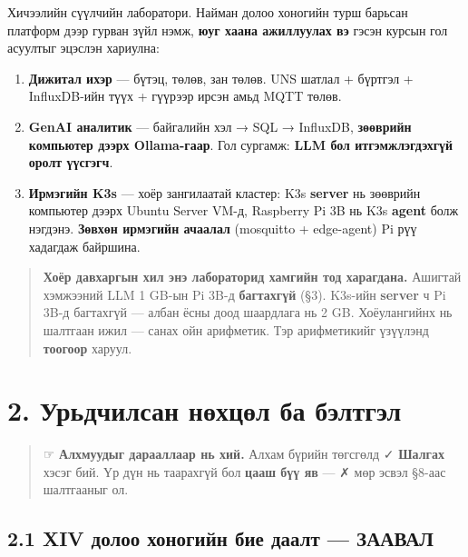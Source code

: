 Хичээлийн сүүлчийн лаборатори. Найман долоо хоногийн турш барьсан платформ дээр гурван зүйл нэмж, \textbf{юуг хаана ажиллуулах вэ} гэсэн курсын гол асуултыг эцэслэн хариулна:

\begin{enumerate}
\def\labelenumi{\arabic{enumi}.}
\tightlist
\item
  \textbf{Дижитал ихэр} --- бүтэц, төлөв, зан төлөв. UNS шатлал + бүртгэл + InfluxDB-ийн түүх + гүүрээр ирсэн амьд MQTT төлөв.
\item
  \textbf{GenAI аналитик} --- байгалийн хэл → SQL → InfluxDB, \textbf{зөөврийн компьютер дээрх Ollama-гаар}. Гол сургамж: \textbf{LLM бол итгэмжлэгдэхгүй оролт үүсгэгч}.
\item
  \textbf{Ирмэгийн K3s} --- хоёр зангилаатай кластер: K3s \textbf{server} нь зөөврийн компьютер дээрх Ubuntu Server VM-д, Raspberry Pi 3B нь K3s \textbf{agent} болж нэгдэнэ. \textbf{Зөвхөн ирмэгийн ачаалал} (mosquitto + edge-agent) Pi рүү хадагдаж байршина.
\end{enumerate}

\begin{quote}
\textbf{Хоёр давхаргын хил энэ лабораторид хамгийн тод харагдана.} Ашигтай хэмжээний LLM 1 GB-ын Pi 3B-д \textbf{багтахгүй} (§3). K3s-ийн \textbf{server} ч Pi 3B-д багтахгүй --- албан ёсны доод шаардлага нь 2 GB. Хоёулангийнх нь шалтгаан ижил --- санах ойн арифметик. Тэр арифметикийг үзүүлэнд \textbf{тоогоор} харуул.
\end{quote}

\hypertarget{ux443ux440ux44cux434ux447ux438ux43bux441ux430ux43d-ux43dux4e9ux445ux446ux4e9ux43b-ux431ux430-ux431ux44dux43bux442ux433ux44dux43b}{%
\section{2. Урьдчилсан нөхцөл ба бэлтгэл}\label{ux443ux440ux44cux434ux447ux438ux43bux441ux430ux43d-ux43dux4e9ux445ux446ux4e9ux43b-ux431ux430-ux431ux44dux43bux442ux433ux44dux43b}}

\begin{quote}
☞ \textbf{Алхмуудыг дарааллаар нь хий.} Алхам бүрийн төгсгөлд ✓ \textbf{Шалгах} хэсэг бий. Үр дүн нь таарахгүй бол \textbf{цааш бүү яв} --- ✗ мөр эсвэл §8-аас шалтгааныг ол.
\end{quote}

\hypertarget{xiv-ux434ux43eux43bux43eux43e-ux445ux43eux43dux43eux433ux438ux439ux43d-ux431ux438ux435-ux434ux430ux430ux43bux442-ux437ux430ux430ux432ux430ux43b}{%
\subsection{2.1 XIV долоо хоногийн бие даалт --- ЗААВАЛ}\label{xiv-ux434ux43eux43bux43eux43e-ux445ux43eux43dux43eux433ux438ux439ux43d-ux431ux438ux435-ux434ux430ux430ux43bux442-ux437ux430ux430ux432ux430ux43b}}

